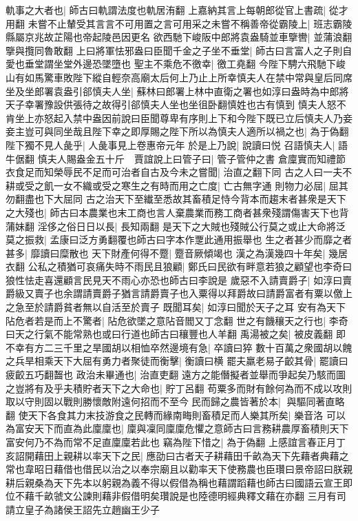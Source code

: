 軌事之大者也|{
	師古曰軌謂法度也軌居洧翻}
上嘉納其言上每朝郎從官上書疏|{
	從才用翻}
未嘗不止輦受其言言不可用置之言可用采之未嘗不稱善帝從霸陵上|{
	班志霸陵縣屬京兆故芷陽也帝起陵邑因更名}
欲西馳下峻阪中郎將袁盎騎並車擥轡|{
	並蒲浪翻擥與攬同魯敢翻}
上曰將軍怯邪盎曰臣聞千金之子坐不垂堂|{
	師古曰言富人之子則自愛也垂堂謂坐堂外邊恐墜墮也}
聖主不乘危不徼幸|{
	徼工堯翻}
今陛下騁六飛馳下峻山有如馬驚車敗陛下縱自輕奈高廟太后何上乃止上所幸慎夫人在禁中常與皇后同席坐及坐郎署袁盎引郤慎夫人坐|{
	蘇林曰郎署上林中直衛之署也如淳曰盎時為中郎將天子幸署豫設供張待之故得引郤慎夫人坐也坐徂卧翻慎姓也古有慎到}
慎夫人怒不肯坐上亦怒起入禁中盎因前說曰臣聞尊卑有序則上下和今陛下既已立后慎夫人乃妾妾主豈可與同坐哉且陛下幸之即厚賜之陛下所以為慎夫人適所以禍之也|{
	為于偽翻}
陛下獨不見人彘乎|{
	人彘事見上卷惠帝元年}
於是上乃說|{
	說讀曰悦}
召語慎夫人|{
	語牛倨翻}
慎夫人賜盎金五十斤　賈誼說上曰管子曰|{
	管子管仲之書}
倉廩實而知禮節衣食足而知榮辱民不足而可治者自古及今未之嘗聞|{
	治直之翻下同}
古之人曰一夫不耕或受之飢一女不織或受之寒生之有時而用之亡度|{
	亡古無字通}
則物力必屈|{
	屈其勿翻盡也下大屈同}
古之治天下至纎至悉故其畜積足恃今背本而趨末者甚衆是天下之大殘也|{
	師古曰本農業也末工商也言人棄農業而務工商者甚衆殘謂傷害天下也背蒲妹翻}
淫侈之俗日日以長|{
	長知兩翻}
是天下之大賊也殘賊公行莫之或止大命將泛莫之振救|{
	孟康曰泛方勇翻覆也師古曰字本作覂此通用振舉也}
生之者甚少而靡之者甚多|{
	靡讀曰糜散也}
天下財產何得不蹷|{
	蹷音厥傾竭也}
漢之為漢幾四十年矣|{
	幾居衣翻}
公私之積猶可哀痛失時不雨民且狼顧|{
	鄭氏曰民欲有畔意若狼之顧望也李奇曰狼性怯走喜還顧言民見天不雨心亦恐也師古曰李說是}
歲惡不入請賣爵子|{
	如淳曰賣爵級又賣子也余謂請賣爵子猶言請爵賣子也入粟得以拜爵故曰請爵富者有粟以儌上之急至於請爵貧者無以自活至於賣子}
既聞耳矣|{
	如淳曰聞於天子之耳}
安有為天下阽危者若是而上不驚者|{
	阽危欲墜之意阽音閻又丁念翻}
世之有饑穰天之行也|{
	李奇曰天之行氣不能常熟也或曰行道也師古曰穰豐也人羊翻}
禹湯被之矣|{
	被皮義翻}
即不幸有方二三千里之旱國胡以相恤卒然邊境有急|{
	卒讀曰猝}
數十百萬之衆國胡以餽之兵旱相乘天下大屈有勇力者聚徒而衡擊|{
	衡讀曰横}
罷夫羸老易子齩其骨|{
	罷讀曰疲齩五巧翻齧也}
政治未畢通也|{
	治直吏翻}
遠方之能僭擬者並舉而爭起矣乃駭而圖之豈將有及乎夫積貯者天下之大命也|{
	貯丁呂翻}
苟粟多而財有餘何為而不成以攻則取以守則固以戰則勝懷敵附遠何招而不至今民而歸之農皆著於本|{
	與驅同著直略翻}
使天下各食其力末技游食之民轉而緣南畮則畜積足而人樂其所矣|{
	樂音洛}
可以為富安天下而直為此廩廩也|{
	廩與凜同廩廩危懼之意師古曰言務耕農厚畜積則天下富安何乃不為而常不足直廩廩若此也}
竊為陛下惜之|{
	為于偽翻}
上感誼言春正月丁亥詔開藉田上親耕以率天下之民|{
	應劭曰古者天子耕藉田千畝為天下先藉者典藉之常也韋昭日藉借也借民以治之以奉宗廟且以勸率天下使務農也臣瓚曰景帝詔曰朕親耕后親桑為天下先本以躬親為義不得以假借為稱也藉謂蹈藉也師古曰國語云宣王即位不藉千畝虢文公諫則藉非假借明矣瓚說是也陸德明經典釋文藉在亦翻}
三月有司請立皇子為諸侯王詔先立趙幽王少子

